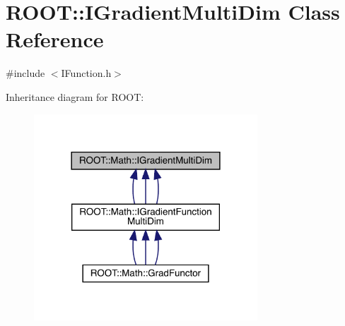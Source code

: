 \hypertarget{classROOT_1_1Math_1_1IGradientMultiDim}{}\section{R\+O\+OT\+:\+:I\+Gradient\+Multi\+Dim Class Reference}
\label{classROOT_1_1Math_1_1IGradientMultiDim}


{\ttfamily \#include $<$I\+Function.\+h$>$}



Inheritance diagram for R\+O\+OT\+:
\nopagebreak
\begin{figure}[H]
\begin{center}
\leavevmode
\includegraphics[width=237pt]{d9/d37/classROOT_1_1Math_1_1IGradientMultiDim__inherit__graph}
\end{center}
\end{figure}

